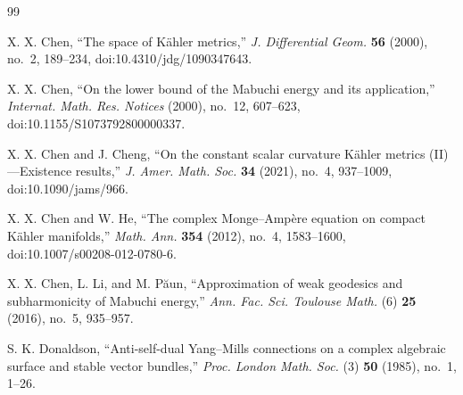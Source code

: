 \documentclass[10pt, letterpaper]{amsart}
\theoremstyle{plain}
\theoremstyle{definition}
\numberwithin{equation}{section}
\begin{document}
\begin{thebibliography}{99}



 X. X. Chen, ``The space of K\"ahler metrics,''
\emph{J. Differential Geom.} \textbf{56} (2000), no.~2, 189--234,
doi:10.4310/jdg/1090347643.


 X. X. Chen, ``On the lower bound of the Mabuchi energy and its
application,'' \emph{Internat. Math. Res. Notices} (2000), no.~12,
607--623, doi:10.1155/S1073792800000337.


 X. X. Chen and J. Cheng,
``On the constant scalar curvature K\"ahler metrics (II)---Existence
results,'' \emph{J. Amer. Math. Soc.} \textbf{34} (2021), no.~4,
937--1009, doi:10.1090/jams/966.

 X. X. Chen and W. He,
``The complex Monge--Amp\`ere equation on compact K\"ahler manifolds,''
\emph{Math. Ann.} \textbf{354} (2012), no.~4, 1583--1600,
doi:10.1007/s00208-012-0780-6.

 X. X. Chen, L. Li, and M. P\u{a}un,
``Approximation of weak geodesics and subharmonicity of Mabuchi energy,''
\emph{Ann. Fac. Sci. Toulouse Math.} (6) \textbf{25} (2016), no.~5,
935--957.




 S. K. Donaldson,
``Anti-self-dual Yang--Mills connections on a complex algebraic surface and
stable vector bundles,'' \emph{Proc. London Math. Soc.} (3) \textbf{50}
(1985), no.~1, 1--26.


\end{thebibliography}
\end{document}
